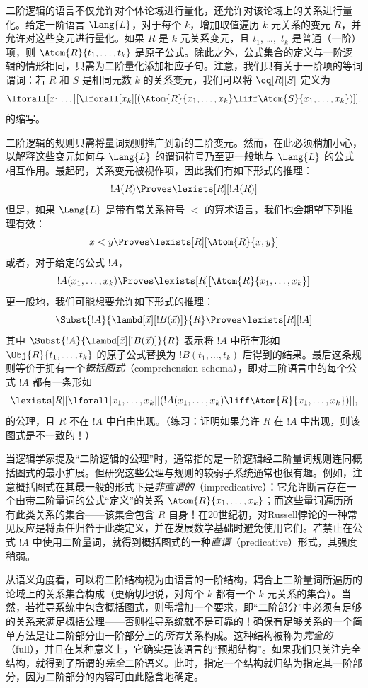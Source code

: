\documentclass[../../../include/open-logic-section]{subfiles}
\begin{document}


二阶逻辑的语言不仅允许对个体论域进行量化，还允许对该论域上的关系进行量化。给定一阶语言 $\Lang{L}$，对于每个 $k$，增加取值遍历 $k$ 元关系的变元 $R$，并允许对这些变元进行量化。如果 $R$ 是 $k$ 元关系变元，且 $t_1$, \dots,~$t_k$ 是普通（一阶）项，则 $\Atom{R}{t_1,\dots,t_k}$ 是原子公式。除此之外，公式集合的定义与一阶逻辑的情形相同，只需为二阶量化添加相应子句。注意，我们只有关于一阶项的等词谓词：若 $R$ 和 $S$ 是相同元数 $k$ 的关系变元，我们可以将 $\eq[R][S]$ 定义为
\[
\lforall[x_1 \dots][\lforall[x_k][(\Atom{R}{x_1, \dots, x_k} \liff
  \Atom{S}{x_1, \dots, x_k})]].
\]
的缩写。

二阶逻辑的规则只需将量词规则推广到新的二阶变元。然而，在此必须稍加小心，以解释这些变元如何与 $\Lang{L}$ 的谓词符号乃至更一般地与 $\Lang{L}$ 的公式相互作用。最起码，关系变元被视作项，因此我们有如下形式的推理：
\[
!A(R) \Proves \lexists[R][!A(R)]
\]
但是，如果 $\Lang{L}$ 是带有常关系符号 $<$ 的算术语言，我们也会期望下列推理有效：
\[
x < y \Proves \lexists[R][\Atom{R}{x,y}]
\]
或者，对于给定的公式 $!A$，
\[
!A(x_1, \dots, x_k) \Proves \lexists[R][\Atom{R}{x_1,\dots,x_k}]
\]
更一般地，我们可能想要允许如下形式的推理：
\[
\Subst{!A}{\lambd[\vec x][!B(\vec x)]}{R} \Proves
\lexists[R][!A]
\]
其中 $\Subst{!A}{\lambd[\vec x][!B(\vec x)]}{R}$ 表示将 $!A$ 中所有形如
$\Obj{R}{t_1,\dots,t_k}$ 的原子公式替换为 $!B(t_1, \dots, t_k)$ 后得到的结果。最后这条规则等价于拥有一个{\em 概括图式}（comprehension schema），即对二阶语言中的每个公式 $!A$ 都有一条形如
\[
\lexists[R][\lforall[x_1, \dots, x_k][(!A(x_1, \dots, x_k) \liff
\Atom{R}{x_1, \dots, x_k})]],
\]
的公理，且 $R$ 不在 $!A$ 中自由出现。（练习：证明如果允许 $R$ 在 $!A$ 中出现，则该图式是不一致的！）

当逻辑学家提及“二阶逻辑的公理”时，通常指的是一阶逻辑经二阶量词规则连同概括图式的最小扩展。但研究这些公理与规则的较弱子系统通常也很有趣。例如，注意概括图式在其最一般的形式下是\emph{非直谓的}（impredicative）：它允许断言存在一个由带二阶量词的公式“定义”的关系 $\Atom{R}{x_1, \dots, x_k}$；而这些量词遍历所有此类关系的集合——该集合包含 $R$ 自身！在20世纪初，对Russell悖论的一种常见反应是将责任归咎于此类定义，并在发展数学基础时避免使用它们。若禁止在公式 $!A$ 中使用二阶量词，就得到概括图式的一种{\em 直谓}（predicative）形式，其强度稍弱。

从语义角度看，可以将二阶结构视为由语言的一阶结构，耦合上二阶量词所遍历的论域上的关系集合构成（更确切地说，对每个 $k$ 都有一个 $k$ 元关系的集合）。当然，若推导系统中包含概括图式，则需增加一个要求，即“二阶部分”中必须有足够的关系来满足概括公理——否则推导系统就不是可靠的！确保有足够关系的一个简单方法是让二阶部分由一阶部分上的\emph{所有}关系构成。这种结构被称为\emph{完全的}（full），并且在某种意义上，它确实是该语言的“预期结构”。如果我们只关注完全结构，就得到了所谓的\emph{完全}二阶语义。此时，指定一个结构就归结为指定其一阶部分，因为二阶部分的内容可由此隐含地确定。
\end{document}
